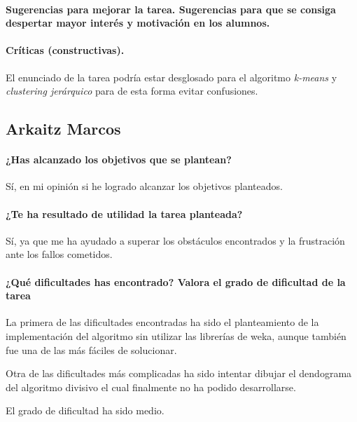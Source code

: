 \documentclass[11pt, titlepage,a4paper]{article}
\begin{document}
\paragraph{Sugerencias para mejorar la tarea. Sugerencias para que se consiga despertar mayor
interés y motivación en los alumnos.\\}

\paragraph{Críticas (constructivas).\\}
El enunciado de la tarea podría estar desglosado para el algoritmo
\textit{k-means} y \textit{clustering jerárquico} para de esta forma evitar confusiones.

\subsection{Arkaitz Marcos}
\paragraph{¿Has alcanzado los objetivos que se plantean?\\}
Sí, en mi opinión si he logrado alcanzar los objetivos planteados.


\paragraph{¿Te ha resultado de utilidad la tarea planteada?\\}
Sí, ya que me ha ayudado a superar los obstáculos encontrados y la frustración
ante los fallos cometidos.

\paragraph{¿Qué dificultades has encontrado? Valora el grado de dificultad de
la tarea\\}
La primera de las dificultades encontradas ha sido el planteamiento de la
implementación del algoritmo sin utilizar las librerías de weka, aunque también
fue una de las más fáciles de solucionar.

Otra de las dificultades más complicadas ha sido intentar dibujar el dendograma
del algoritmo divisivo el cual finalmente no ha podido desarrollarse.

El grado de dificultad ha sido medio.
\end{document}
